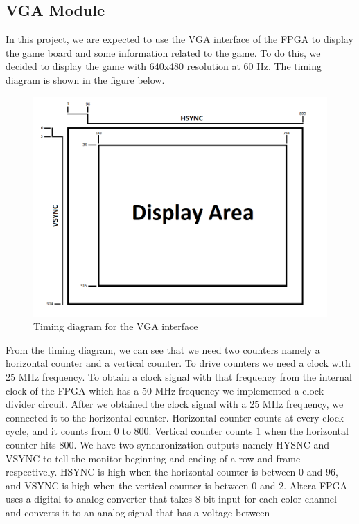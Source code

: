 \documentclass[conference]{IEEEtran}
\begin{document}
\subsection{VGA Module}
In this project, we are expected to use the VGA interface of the FPGA to display the game board and some information related to the game. 
To do this, we decided to display the game with 640x480 resolution at 60 Hz. \cite{vga} The timing diagram is shown in the figure below.
\begin{figure}[H]
  \centerline{\includegraphics[scale=0.4]{vga.png}}
   \caption{Timing diagram for the VGA interface}
   \label{Fig. 1.}
\end{figure} 
From the timing diagram, we can see that we need two counters namely a horizontal counter and a vertical counter.
To drive counters we need a clock with 25 MHz frequency. 
To obtain a clock signal with that frequency from the internal clock of the FPGA which has a 50 MHz frequency we implemented a clock divider circuit. 
After we obtained the clock signal with a 25 MHz frequency, we connected it to the horizontal counter. 
Horizontal counter counts at every clock cycle, and it counts from 0 to 800. Vertical counter counts 1 when the horizontal counter hits 800. 
We have two synchronization outputs namely HYSNC and VSYNC to tell the monitor beginning and ending of a row and frame respectively. 
HSYNC is high when the horizontal counter is between 0 and 96, and VSYNC is high when the vertical counter is between 0 and 2. 
Altera FPGA uses a digital-to-analog converter that takes 8-bit input for each color channel and converts it to an analog signal that has a voltage between 
\end{document}
